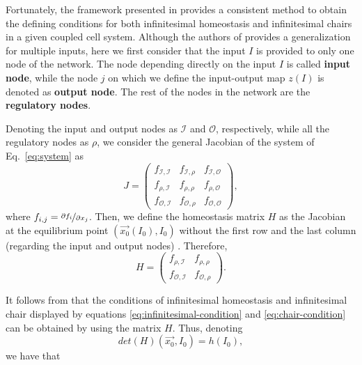 Fortunately, the framework presented in \cite{wang2021} provides a consistent 
method to obtain the defining conditions for both infinitesimal homeostasis and 
infinitesimal chairs in a given coupled cell system. Although the authors of 
\cite{multi_input_antoneli2020} provides a generalization for multiple inputs, 
here we first consider that the input $I$ is provided to only one node of the network. 
The node depending directly on the input $I$ is called \textbf{input node}, while 
the node $j$ on which we define the input-output map $z(I)$ is denoted as 
\textbf{output node}. The rest of the nodes in the network are the 
\textbf{regulatory nodes}.

Denoting the input and output nodes as $\mathcal{I}$ and $\mathcal{O}$, respectively, 
while all the regulatory nodes as $\rho$, we consider the general Jacobian of the 
system of Eq.~\ref{eq:system} as 
\begin{equation}
    J = 
    \begin{pmatrix}
        f_{\mathcal{I}, \mathcal{I}} & f_{\mathcal{I}, \rho} & f_{\mathcal{I}, \mathcal{O}} \\
        f_{\rho, \mathcal{I}} & f_{\rho, \rho} & f_{\rho, \mathcal{O}}\\
        f_{\mathcal{O}, \mathcal{I}} & f_{\mathcal{O}, \rho} & f_{\mathcal{O}, \mathcal{O}}
    \end{pmatrix},
\end{equation}
where $f_{i,j} = \nicefrac{\partial f_i}{\partial x_j}$. Then, we define the homeostasis matrix 
$H$ as the Jacobian at the equilibrium point $(\vec{x_0}(I_0), I_0)$ without the first row and 
the last column (regarding the input and output nodes) \cite{wang2021}. Therefore,
\begin{equation}
    H = 
    \begin{pmatrix}
        f_{\rho, \mathcal{I}} & f_{\rho, \rho} \\
        f_{\mathcal{O}, \mathcal{I}} & f_{\mathcal{O}, \rho} 
    \end{pmatrix}.
\end{equation}

It follows from \cite{wang2021} that the conditions of infinitesimal homeostasis and
infinitesimal chair displayed by equations \ref{eq:infinitesimal-condition} and 
\ref{eq:chair-condition} can be obtained by using the matrix $H$. Thus, denoting
\begin{equation}
    det(H)(\vec{x_0}, I_0) = h(I_0),
\end{equation}
we have that

